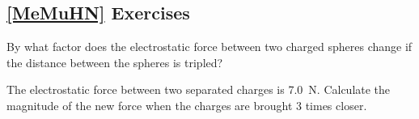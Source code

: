 \documentclass[dvipsnames]{article}
\numberwithin{equation}{section}
\numberwithin{figure}{section}
\begin{document}













\subsection*{\ref{MeMuHN} Exercises}

\begin{exercise} \label{WFMudS}
    By what factor does the electrostatic force between two charged spheres change if the distance between the spheres is tripled?
\end{exercise}

\begin{exercise} \label{t77ZZC}
    The electrostatic force between two separated charges is \SI{7.0}{N}. Calculate the magnitude of the new force when the charges are brought 3 times closer. 
\end{exercise}
\end{document}
